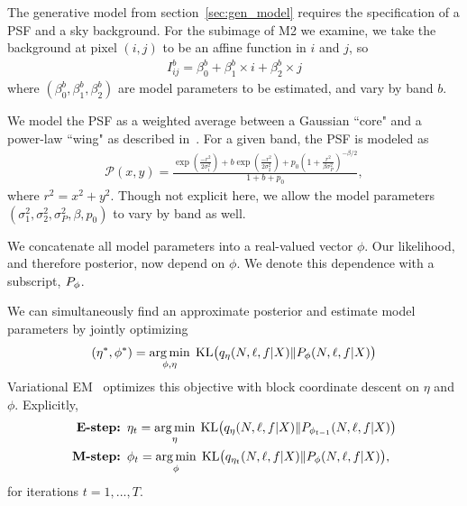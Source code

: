 The generative model from section~\ref{sec:gen_model} requires
the specification of a PSF and a sky background. 
For the subimage of M2 we examine, 
we take the background at pixel $(i, j)$ to be an affine function in $i$ and $j$, so 
\begin{align}
    I_{ij}^{b} = \beta_0^{b} + \beta_1^{b} \times i + \beta_2^{b} \times j
\end{align}
where $(\beta_0^{b}, \beta_1^{b}, \beta_2^{b})$ are model parameters to be estimated, and 
vary by band $b$. 


We model the PSF as a weighted average between a Gaussian ``core" and a power-law ``wing" as described in~\cite{Xin2018psf}. For a given band, the PSF is modeled as 
\begin{align}
    \mathcal{P}(x, y) = \frac{\exp(\frac{-r^2}{2\sigma_1^2}) + 
                            b \exp(\frac{-r^2}{2\sigma_2^2}) + 
                            p_0(1 + \frac{r^2}{\beta\sigma^2_P})^{-\beta/2} }{1 + b + p_0},
\end{align}
where $r^2 = x^2 + y^2$. Though not explicit here, we allow the model parameters 
$(\sigma_1^2, \sigma_2^2, \sigma_P^2, \beta, p_0)$ to vary by band as well. 

We concatenate all model parameters into a real-valued vector $\phi$.
Our likelihood, and therefore posterior, now depend on $\phi$. We denote this dependence with a subscript, $P_\phi$. 

We can simultaneously find an approximate posterior and 
estimate model parameters by jointly optimizing 
\begin{align}
(\eta^*, \phi^*) = \operatorname*{arg\,min}_{\phi, \eta} \; \mathrm{KL}\big (q_{\eta}(N, \ell, f |X) \| P_{\phi}(N, \ell, f | X)\big)\label{eq:em_obj}
\end{align}
Variational EM~\cite{Jordan_intro_vi, neal2000varem, Beal2002varem} optimizes this objective with block coordinate descent on $\eta$ and $\phi$. Explicitly, 
\begin{align}
    \text{{\bf E-step: }} & 
    \eta_{t} = \operatorname*{arg\,min}_\eta \; \mathrm{KL}\big (q_{\eta    }(N, \ell, f |X) \| P_{\phi_{t - 1}}(N, \ell, f | X)\big)
    \label{eq:e_step}
    \\
    \text{{\bf M-step: }} & \phi_{t} = \operatorname*{arg\,min}_{\phi} \; \mathrm{KL}\big (q_{\eta_t}(N, \ell, f |X) \| P_{\phi}(N, \ell, f | X)\big), 
    \label{eq:m_step}
\end{align}
for iterations $t = 1, ..., T$. 

